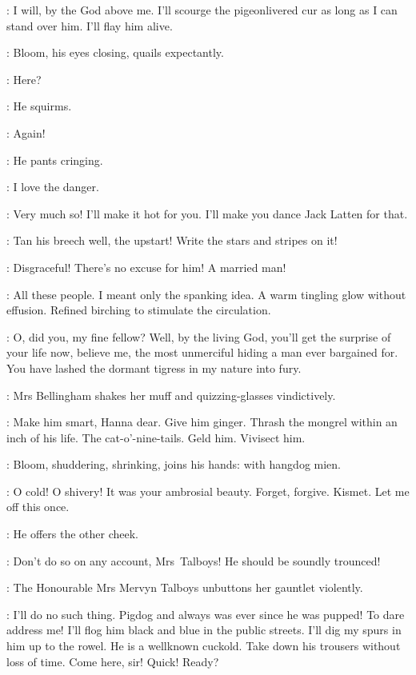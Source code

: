 \Talboys:
I will,
by the God above me.
I'll scourge the pigeonlivered cur as long as I can stand over him.
I'll flay him alive.

:
Bloom,
his eyes closing,
quails expectantly.

\Bloom:
Here?

:
He squirms.

\Bloom:
Again!

:
He pants cringing.

\Bloom:
I love the danger.

\Talboys:
Very much so!
I'll make it hot for you.
I'll make you dance Jack Latten for that.

\Bellingham:
Tan his breech well,
the upstart!
Write the stars and stripes on it!

\Yelverton:
Disgraceful!
There's no excuse for him!
A married man!

\Bloom:
All these people.
I meant only the spanking idea.
A warm tingling glow without effusion.
Refined birching to stimulate the circulation.

\Talboys:
O,
did you,
my fine fellow?
Well,
by the living God,
you'll get the surprise of your life now,
believe me,
the most unmerciful hiding a man ever bargained for.
You have lashed the dormant tigress in my nature into fury.

:
Mrs Bellingham shakes her muff and quizzing-glasses vindictively.

\Bellingham:
Make him smart,
Hanna dear.
Give him ginger.
Thrash the mongrel within an inch of his life.
The cat-o'-nine-tails.
Geld him.
Vivisect him.

:
Bloom,
shuddering,
shrinking,
joins his hands:
with hangdog mien.

\Bloom:
O cold!
O shivery!
It was your ambrosial beauty.
Forget,
forgive.
Kismet.
Let me off this once.

:
He offers the other cheek.

\Yelverton:
Don't do so on any account,
Mrs~Talboys!
He should be soundly trounced!

:
The Honourable Mrs Mervyn Talboys unbuttons her gauntlet violently.

\Talboys:
I'll do no such thing.
Pigdog and always was ever since he was pupped!
To dare address me!
I'll flog him black and blue in the public streets.
I'll dig my spurs in him up to the rowel.
He is a wellknown cuckold.
Take down his trousers without loss of time.
Come here,
sir!
Quick!
Ready?

